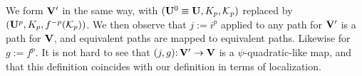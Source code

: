 We form ${\mathbf{V}}'$ in the same way, with $(\mathbf U^0 \equiv \mathbf U, K_p, {\mathcal K}_p)$ replaced by $(\mathbf U^p, K_p, f^{-p}({\mathcal K}_p))$. We then observe that $j:=i^p$ applied to any path for ${\mathbf{V}}'$ is a path for ${\mathbf{V}}$, and equivalent paths are mapped to equivalent paths. Likewise for $g := f^p$. It is not hard to see that $(j, g)\mathpunct: {\mathbf{V}}' \to {\mathbf{V}}$ is a $\psi$-quadratic-like map, and that this definition coincides with our definition in terms of localization.

